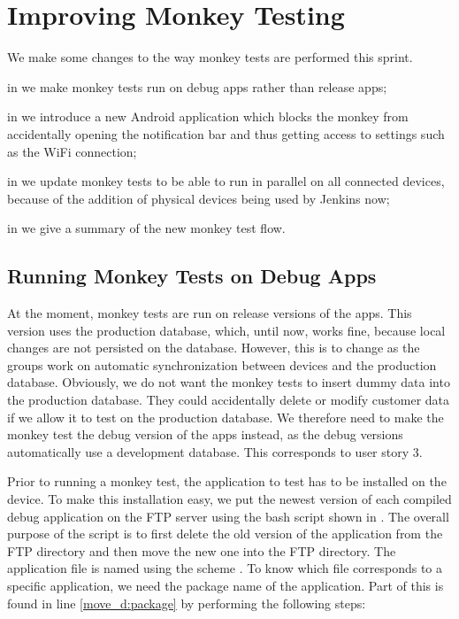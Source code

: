\chapter{Improving Monkey Testing}
We make some changes to the way monkey tests are performed this sprint.

\begin{chapterorganization}
  \item in  we make monkey tests run on debug apps rather than release apps;
  \item in  we introduce a new Android application which blocks the monkey from accidentally opening the notification bar and thus getting access to settings such as the WiFi connection;
  \item in  we update monkey tests to be able to run in parallel on all connected devices, because of the addition of physical devices being used by Jenkins now;
  \item in  we give a summary of the new monkey test flow.
\end{chapterorganization}

\section{Running Monkey Tests on Debug Apps}\label{sec:monkey_test_debug_app}
At the moment, monkey tests are run on release versions of the apps. This version uses the production database, which, until now, works fine, because local changes are not persisted on the database. However, this is to change as the \db{} groups work on automatic synchronization between devices and the production database. Obviously, we do not want the monkey tests to insert dummy data into the production database. They could accidentally delete or modify customer data if we allow it to test on the production database. We therefore need to make the monkey test the debug version of the apps instead, as the debug versions automatically use a development database. This corresponds to user story 3.

Prior to running a monkey test, the application to test has to be installed on the device. To make this installation easy, we put the newest version of each compiled debug application on the FTP server using the bash script shown in . The overall purpose of the script is to first delete the old version of the application from the FTP directory and then move the new one into the FTP directory. The application file is named using the scheme . To know which file corresponds to a specific application, we need the package name of the application. Part of this is found in line \ref{move_d:package} by performing the following steps:

